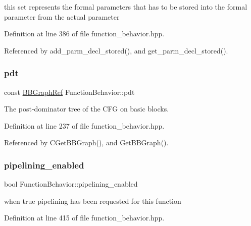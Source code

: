 this set represents the formal parameters that has to be stored into the formal parameter from the actual parameter 



Definition at line 386 of file function\+\_\+behavior.\+hpp.



Referenced by add\+\_\+parm\+\_\+decl\+\_\+stored(), and get\+\_\+parm\+\_\+decl\+\_\+stored().

\mbox{\label{classFunctionBehavior_a8fd7d69eac3336a63a3b923cc79d9823}} 
\subsubsection{\texorpdfstring{pdt}{pdt}}
{\footnotesize\ttfamily const \hyperlink{basic__block_8hpp_a0e7f233d1b83cad0bfd5aa865f0d3532}{B\+B\+Graph\+Ref} Function\+Behavior\+::pdt\hspace{0.3cm}{\ttfamily [private]}}



The post-\/dominator tree of the C\+FG on basic blocks. 



Definition at line 237 of file function\+\_\+behavior.\+hpp.



Referenced by C\+Get\+B\+B\+Graph(), and Get\+B\+B\+Graph().

\mbox{\label{classFunctionBehavior_a8e15531441e9ce43c33eb178ecc5b660}} 
\subsubsection{\texorpdfstring{pipelining\+\_\+enabled}{pipelining\_enabled}}
{\footnotesize\ttfamily bool Function\+Behavior\+::pipelining\+\_\+enabled\hspace{0.3cm}{\ttfamily [private]}}



when true pipelining has been requested for this function 



Definition at line 415 of file function\+\_\+behavior.\+hpp.


